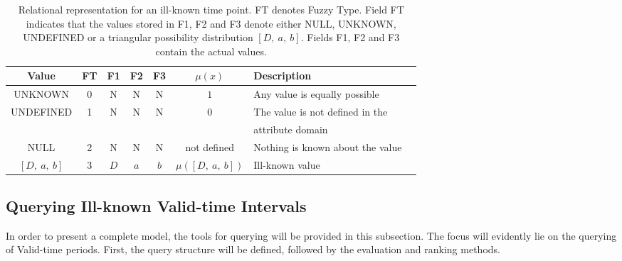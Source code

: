 \begin{table}
\centering
\begin{tabular}{c c c c c c l p{2cm}}
\hline
Value & FT & F1 & F2 & F3 & $\mu(x)$ & Description \\ \hline
UNKNOWN & 0 & N & N & N  & $1$ & Any value is equally possible\\ 
UNDEFINED & 1 & N & N & N & $0$ & The value is not defined in the \\
          &   &   &   &   &     & attribute domain\\ 
NULL & 2 & N & N & N &not defined & Nothing is known about the value \\ 
$\left[D,\ a,\ b \right]$ & 3 & $D$ & $a$ & $b$ & $\mu(\left[D,\ a,\ b \right])$ & Ill-known value \\ 
\hline 
\end{tabular}
\label{table:relational-representation-pvp}

\vspace{10pt}

\caption{Relational representation for an ill-known time point. FT denotes Fuzzy Type. Field FT indicates that the values stored in F1, F2 and F3 denote either NULL, UNKNOWN, UNDEFINED or a triangular possibility distribution $\left[D,\ a,\ b \right]$. Fields F1, F2 and F3 contain the actual values.}%
\end{table}

\vspace{-25pt}

\subsection{Querying Ill-known Valid-time Intervals}
In order to present a complete model, the tools for querying will be provided in this subsection. The focus will evidently lie on the querying of Valid-time periods. First, the query structure will be defined, followed by the evaluation and ranking methods.




